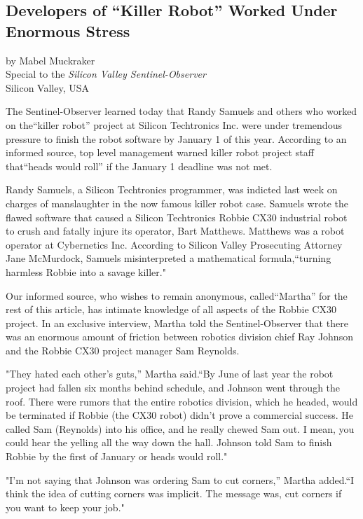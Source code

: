 \begin{center}
\section*{Developers of ``Killer Robot'' Worked Under Enormous Stress}
by Mabel Muckraker\\
Special to the \textit{Silicon Valley Sentinel-Observer}\\
Silicon Valley, USA
\end{center}

The Sentinel-Observer learned today that Randy Samuels and others who worked on the``killer robot'' project at Silicon Techtronics Inc. were under tremendous pressure to finish the robot software by January 1 of this year. According to an informed source, top level management warned killer robot project staff that``heads would roll'' if the January 1 deadline was not met.

Randy Samuels, a Silicon Techtronics programmer, was indicted last week on charges of manslaughter in the now famous killer robot case. Samuels wrote the flawed software that caused a Silicon Techtronics Robbie CX30 industrial robot to crush and fatally injure its operator, Bart Matthews. Matthews was a robot operator at Cybernetics Inc. According to Silicon Valley Prosecuting Attorney Jane McMurdock, Samuels misinterpreted a mathematical formula,``turning harmless Robbie into a savage killer."

Our informed source, who wishes to remain anonymous, called``Martha'' for the rest of this article, has intimate knowledge of all aspects of the Robbie CX30 project. In an exclusive interview, Martha told the Sentinel-Observer that there was an enormous amount of friction between robotics division chief Ray Johnson and the Robbie CX30 project manager Sam Reynolds.

"They hated each other's guts,'' Martha said.``By June of last year the robot project had fallen six months behind schedule, and Johnson went through the roof. There were rumors that the entire robotics division, which he headed, would be terminated if Robbie (the CX30 robot) didn't prove a commercial success. He called Sam (Reynolds) into his office, and he really chewed Sam out. I mean, you could hear the yelling all the way down the hall. Johnson told Sam to finish Robbie by the first of January or heads would roll."

"I'm not saying that Johnson was ordering Sam to cut corners,'' Martha added.``I think the idea of cutting corners was implicit. The message was, cut corners if you want to keep your job."

